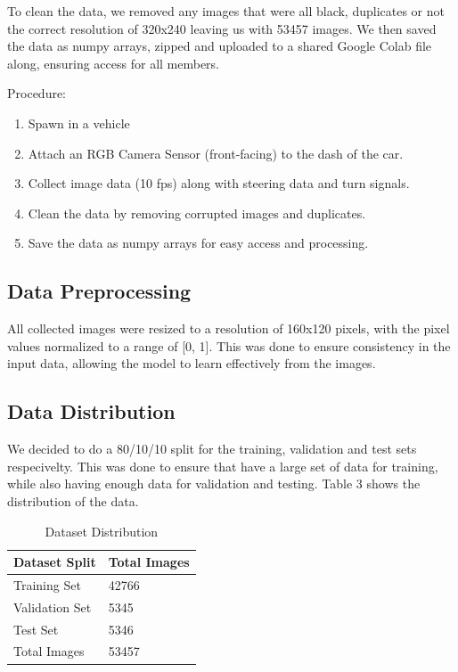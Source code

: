 \documentclass{article} %
\begin{document}
To clean the data, we removed any images that were all black, duplicates or not the correct resolution of 320x240 leaving us with 53457 images.  We then saved 
the data as numpy arrays, zipped and uploaded to a shared Google Colab file along, ensuring access for all members. 

Procedure:
\begin{enumerate}
  \item{Spawn in a vehicle}
  \item{Attach an RGB Camera Sensor (front-facing) to the dash of the car.}
  \item{Collect image data (10 fps) along with steering data and turn signals.}
  \item {Clean the data by removing corrupted images and duplicates.}
  \item {Save the data as numpy arrays for easy access and processing.}
\end{enumerate}


\subsection{Data Preprocessing}
All collected images were resized to a resolution of 160x120 pixels, with the pixel values normalized to a range of [0, 1]. 
This was done to ensure consistency in the input data, allowing the model to learn effectively from the images.

\subsection{Data Distribution}
We decided to do a 80/10/10 split for the training, validation and test sets respecivelty. This was done to ensure that have a
large set of data for training, while also having enough data for validation and testing. Table 3 shows the distribution of the data.

\begin{table}[h]
\centering
\caption{Dataset Distribution}
\vspace{0.5em}
\begin{tabular}{|p{2cm}|p{2cm}|}
\hline
\textbf{Dataset Split} & \textbf{Total Images} \\ \hline
Training Set           & 42766 \\ \hline
Validation Set         & 5345 \\ \hline
Test Set               & 5346 \\ \hline
Total Images           & 53457  \\ \hline
\end{tabular}
\end{table}
\end{document}
